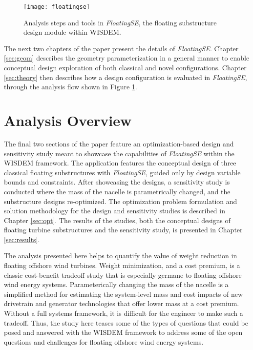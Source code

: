 \begin{figure}[htbp]
  \begin{center}
    \texttt{[image: floatingse]}\\
    \caption{Analysis steps and tools in \textit{FloatingSE}, the floating substructure design module within WISDEM.}
    \label{fig:floatingse}
  \end{center}
\end{figure}

The next two chapters of the paper present the details of
\textit{FloatingSE}.  Chapter \ref{sec:geom} describes the geometry
parameterization in a general manner to enable conceptual design
exploration of both classical and novel configurations.  Chapter
\ref{sec:theory} then describes how a design configuration is evaluated
in \textit{FloatingSE}, through the analysis flow shown in Figure
\ref{fig:floatingse}.

\section{Analysis Overview}
The final two sections of the paper feature an optimization-based design
and sensitivity study meant to showcase the capabilities of
\textit{FloatingSE} within the WISDEM framework.  The application
features the conceptual design of three classical floating substructures
with \textit{FloatingSE}, guided only by design variable bounds and
constraints.  After showcasing the designs, a sensitivity study is
conducted where the mass of the nacelle is parametrically changed, and
the substructure designs re-optimized.  The optimization problem
formulation and solution methodology for the design and sensitivity
studies is described in Chapter \ref{sec:opt}.  The results of the
studies, both the conceptual designs of floating turbine substructures
and the sensitivity study, is presented in Chapter \ref{sec:results}.

The analysis presented here helps to quantify the value of weight
reduction in floating offshore wind turbines.  Weight minimization, and
a cost premium, is a classic cost-benefit tradeoff study that is
especially germane to floating offshore wind energy systems.
Parameterically changing the mass of the nacelle is a simplified method
for estimating the system-level mass and cost impacts of new drivetrain
and generator technologies that offer lower mass at a cost premium.
Without a full systems framework, it is difficult for the engineer to
make such a tradeoff.  Thus, the study here teases some of the types of
questions that could be posed and answered with the WISDEM framework to
address some of the open questions and challenges for floating offshore
wind energy systems.
